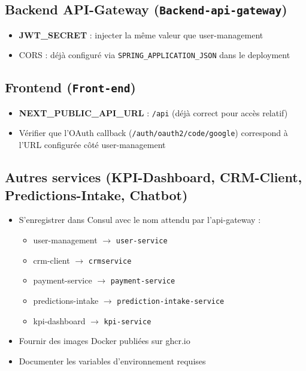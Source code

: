 \documentclass[11pt,a4paper]{article}
\begin{document}
\subsection{Backend API-Gateway (\texttt{Backend-api-gateway})}

\begin{itemize}
  \item \textbf{JWT\_SECRET} : injecter la même valeur que user-management
  \item CORS : déjà configuré via \texttt{SPRING\_APPLICATION\_JSON} dans le deployment
\end{itemize}

\subsection{Frontend (\texttt{Front-end})}

\begin{itemize}
  \item \textbf{NEXT\_PUBLIC\_API\_URL} : \texttt{/api} (déjà correct pour accès relatif)
  \item Vérifier que l’OAuth callback (\texttt{/auth/oauth2/code/google}) correspond à l’URL configurée côté user-management
\end{itemize}

\subsection{Autres services (KPI-Dashboard, CRM-Client, Predictions-Intake, Chatbot)}

\begin{itemize}
  \item S’enregistrer dans Consul avec le nom attendu par l’api-gateway :
  \begin{itemize}[noitemsep]
    \item user-management $\rightarrow$ \texttt{user-service}
    \item crm-client $\rightarrow$ \texttt{crmservice}
    \item payment-service $\rightarrow$ \texttt{payment-service}
    \item predictions-intake $\rightarrow$ \texttt{prediction-intake-service}
    \item kpi-dashboard $\rightarrow$ \texttt{kpi-service}
  \end{itemize}
  \item Fournir des images Docker publiées sur ghcr.io
  \item Documenter les variables d’environnement requises
\end{itemize}
\end{document}
